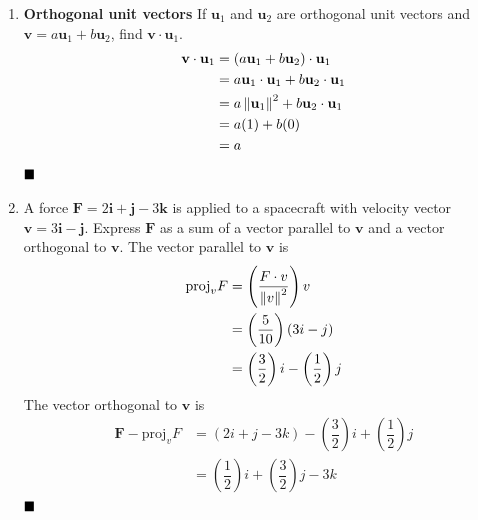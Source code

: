 \begin{enumerate}
          \newpage
          \setcounter{enumi}{28}
    \item \textbf{Orthogonal unit vectors} If $\mathbf{u}_1$ and $\mathbf{u}_2$ are orthogonal unit vectors and $\mathbf{v}=a \mathbf{u}_1+b \mathbf{u}_2$, find $\mathbf{v} \cdot \mathbf{u}_1$.
          \sol{}
          \begin{align*}
              \mathbf{v} \cdot \mathbf{u}_1 & = (a \mathbf{u}_1+b \mathbf{u}_2) \cdot \mathbf{u}_1                  \\
                                            & = a \mathbf{u}_1 \cdot \mathbf{u}_1+b \mathbf{u}_2 \cdot \mathbf{u}_1 \\
                                            & = a \left\lVert\mathbf{u}_1\right\rVert^2 + b \mathbf{u}_2 \cdot \mathbf{u}_1         \\
                                            & = a(1) + b(0)                                                         \\
                                            & = a
          \end{align*}
          $\hfill\blacksquare$

    \item A force $\mathbf{F}=2 \mathbf{i}+\mathbf{j}-3 \mathbf{k}$ is applied to a
          spacecraft with velocity vector $\mathbf{v}=3 \mathbf{i}-\mathbf{j}$. Express
          $\mathbf{F}$ as a sum of a vector parallel to $\mathbf{v}$ and a vector
          orthogonal to $\mathbf{v}$. \sol{} The vector parallel to $\mathbf{v}$ is
          \begin{align*}
              \text{proj}_v F & = \left(\dfrac{F \cdot v}{\left\lVert v\right\rVert^2}\right)v             \\
                              & = \left(\dfrac{5}{10}\right)(3i - j)                      \\
                              & = \left(\dfrac{3}{2}\right)i - \left(\dfrac{1}{2}\right)j
          \end{align*}
          The vector orthogonal to $\mathbf{v}$ is
          \begin{align*}
              \mathbf{F} - \text{proj}_v F & = \left(2i + j - 3k\right) - \left(\dfrac{3}{2}\right)i + \left(\dfrac{1}{2}\right)j \\
                                           & = \left(\dfrac{1}{2}\right)i + \left(\dfrac{3}{2}\right)j - 3k
          \end{align*}
          $\hfill\blacksquare$

\end{enumerate}

